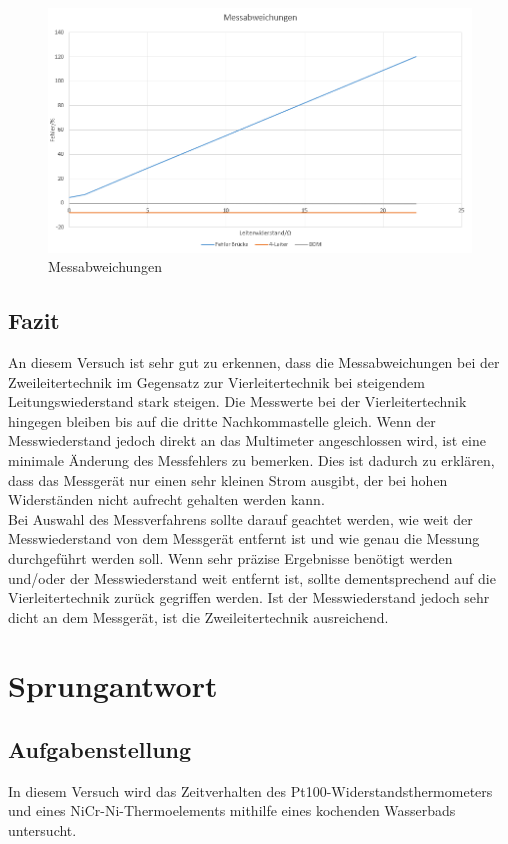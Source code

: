 \documentclass[a4paper,11pt,oneside]{article}
\begin{document}
\begin{figure}[hbtp]
\centering
\includegraphics[scale=0.7]{Bilder/Diagramm_Messabweichungen.png}
\caption{Messabweichungen}
\end{figure}



\subsection{Fazit}
An diesem Versuch ist sehr gut zu erkennen, dass die Messabweichungen bei der Zweileitertechnik im Gegensatz zur Vierleitertechnik bei steigendem Leitungswiederstand stark steigen. Die Messwerte bei der Vierleitertechnik hingegen bleiben bis auf die dritte Nachkommastelle gleich. Wenn der Messwiederstand jedoch direkt an das Multimeter angeschlossen wird, ist eine minimale Änderung des Messfehlers zu bemerken. Dies ist dadurch zu erklären, dass das Messgerät nur einen sehr kleinen Strom ausgibt, der bei hohen Widerständen nicht aufrecht gehalten werden kann.\\
Bei Auswahl des Messverfahrens sollte darauf geachtet werden, wie weit der Messwiederstand von dem Messgerät entfernt ist und wie genau die Messung durchgeführt werden soll. Wenn sehr präzise Ergebnisse benötigt werden und/oder der Messwiederstand weit entfernt ist, sollte dementsprechend auf die Vierleitertechnik zurück gegriffen werden. Ist der Messwiederstand jedoch sehr dicht an dem Messgerät, ist die Zweileitertechnik ausreichend.

\section{Sprungantwort}
\subsection{Aufgabenstellung}
In diesem Versuch wird das Zeitverhalten des Pt100-Widerstandsthermometers und eines NiCr-Ni-Thermoelements mithilfe eines kochenden Wasserbads untersucht. 
\end{document}
